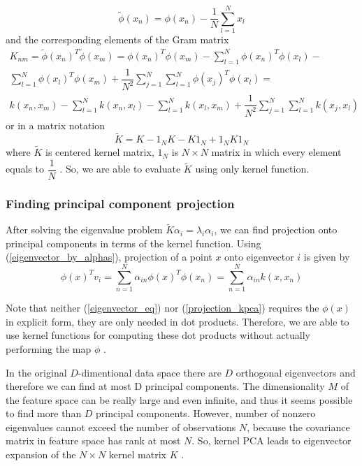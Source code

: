 \begin{equation}
\widetilde{\phi}(x_n) = \phi(x_n) - \frac{1}{N}\sum_{l=1}^{N} x_l
\end{equation}
and the corresponding elements of the Gram matrix
\begin{equation}
\begin{aligned}
K_{nm} = \widetilde{\phi}(x_n)^T\widetilde{\phi}(x_m) = 
\phi(x_n)^T\phi(x_m) -
\sum_{l=1}^{N}{\phi(x_n)^T\phi(x_l)} - \\ \sum_{l=1}^{N}{\phi(x_l)^T\phi(x_m)} +  \dfrac{1}{N^2}\sum_{j=1}^{N}\sum_{l=1}^{N}{\phi(x_j)^T\phi(x_l)} = \\
k(x_n, x_m) - \sum_{l=1}^{N}{k(x_n, x_l)} - \sum_{l=1}^{N}{k(x_l, x_m)} + \dfrac{1}{N^2}\sum_{j=1}^{N}\sum_{l=1}^{N}{k(x_j, x_l)}
\end{aligned}
\end{equation}
or in a matrix notation
\begin{equation}
\widetilde{K} = K - 1_NK - K1_N + 1_NK1_N
\end{equation}
where $\widetilde{K}$ is centered kernel matrix, $1_N$ is $N \times N$ matrix in which every element equals to $\dfrac{1}{N}$ \citep{bishop}.
So, we are able to evaluate $\widetilde{K}$ using only kernel function.
\subsubsection{Finding principal component projection}
After solving the eigenvalue problem $\widetilde{K}\alpha_i = \lambda_i\alpha_i$, we can find projection onto principal components in terms of the kernel function.
Using (\ref{eigenvector_by_alphas}), projection of a point $x$ onto eigenvector $i$ is given by
\begin{equation}\label{projection_kpca}
\phi(x)^Tv_i = \sum_{n=1}^{N}{\alpha_{in}\phi(x)^T\phi(x_n)} = \sum_{n=1}^{N}{\alpha_{in}k(x, x_n)}
\end{equation}

Note that neither (\ref{eigenvector_eq})  nor (\ref{projection_kpca}) requires the $\phi(x)$ in explicit form, they are only needed in dot products. Therefore, we are able to use kernel functions for computing these dot products without actually performing the map $\phi$ \citep{original_paper}. 

In the original $D$-dimentional data space there are $D$ orthogonal eigenvectors and therefore we can find at most D principal components. The dimensionality $M$ of the feature space can be really large and even infinite, and thus it seems possible to find more than $D$ principal components. However, number of nonzero eigenvalues cannot exceed the number of observations $N$, because
the covariance matrix in feature space has rank at most $N$. So, kernel PCA leads to eigenvector expansion of the $N \times N$ kernel matrix $K$ \citep{bishop}.


